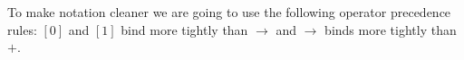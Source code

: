 To make notation cleaner we are going to use the following operator precedence rules:
 $[0]$ and $[1]$ bind more tightly than $\rightarrow$ and $\rightarrow$ binds more tightly than $+$.

\begin{figure}[t]
\begin{centering}
\hfill{}\hfill{}\hfill{}\hfill{}\hfill{}\hfill{}\hfill{}
\end{centering}
\end{figure}

